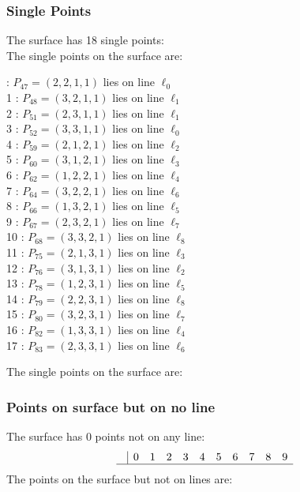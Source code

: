 \documentclass{article}
\begin{document}
{\subsubsection*{Single Points}
The surface has 18 single points:\\
The single points on the surface are:\\
\begin{multicols}{2}
 : $P_{47}=( 2, 2, 1, 1 )$ lies on line $\ell_{0}$\\
1 : $P_{48}=( 3, 2, 1, 1 )$ lies on line $\ell_{1}$\\
2 : $P_{51}=( 2, 3, 1, 1 )$ lies on line $\ell_{1}$\\
3 : $P_{52}=( 3, 3, 1, 1 )$ lies on line $\ell_{0}$\\
4 : $P_{59}=( 2, 1, 2, 1 )$ lies on line $\ell_{2}$\\
5 : $P_{60}=( 3, 1, 2, 1 )$ lies on line $\ell_{3}$\\
6 : $P_{62}=( 1, 2, 2, 1 )$ lies on line $\ell_{4}$\\
7 : $P_{64}=( 3, 2, 2, 1 )$ lies on line $\ell_{6}$\\
8 : $P_{66}=( 1, 3, 2, 1 )$ lies on line $\ell_{5}$\\
9 : $P_{67}=( 2, 3, 2, 1 )$ lies on line $\ell_{7}$\\
10 : $P_{68}=( 3, 3, 2, 1 )$ lies on line $\ell_{8}$\\
11 : $P_{75}=( 2, 1, 3, 1 )$ lies on line $\ell_{3}$\\
12 : $P_{76}=( 3, 1, 3, 1 )$ lies on line $\ell_{2}$\\
13 : $P_{78}=( 1, 2, 3, 1 )$ lies on line $\ell_{5}$\\
14 : $P_{79}=( 2, 2, 3, 1 )$ lies on line $\ell_{8}$\\
15 : $P_{80}=( 3, 2, 3, 1 )$ lies on line $\ell_{7}$\\
16 : $P_{82}=( 1, 3, 3, 1 )$ lies on line $\ell_{4}$\\
17 : $P_{83}=( 2, 3, 3, 1 )$ lies on line $\ell_{6}$\\
\end{multicols}
The single points on the surface are:\\
\subsubsection*{Points on surface but on no line}
The surface has 0 points not on any line:\\
$$
\begin{array}{r|*{10}{r}}
 & 0 & 1 & 2 & 3 & 4 & 5 & 6 & 7 & 8 & 9\\
\hline
\end{array}
$$
The points on the surface but not on lines are:\\
\begin{multicols}{2}
\noindent
\end{multicols}
}
\end{document}
